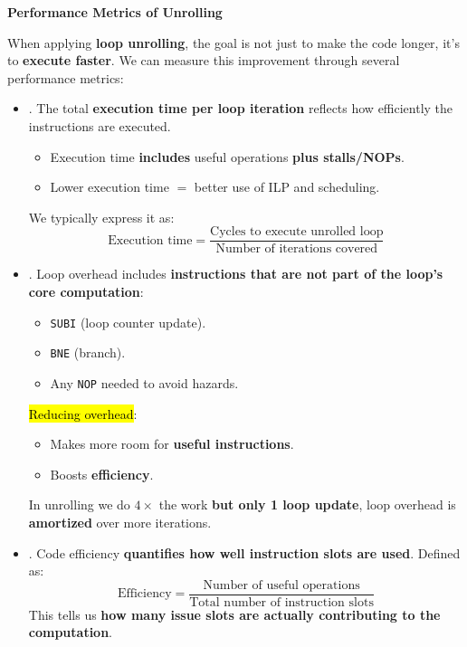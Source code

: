 \begin{flushleft}
    \textcolor{Green3}{\faIcon{\speedIcon} \textbf{Performance Metrics of Unrolling}}
\end{flushleft}
When applying \textbf{loop unrolling}, the goal is not just to make the code longer, it's to \textbf{execute faster}. We can measure this improvement through several performance metrics:
\begin{itemize}
    \item {}. The total \textbf{execution time per loop iteration} reflects how efficiently the instructions are executed.
    \begin{itemize}
        \item Execution time \textbf{includes} useful operations \textbf{plus stalls/NOPs}.
        \item Lower execution time $=$ better use of ILP and scheduling.
    \end{itemize}
    We typically express it as:
    \begin{equation}
        \text{Execution time} = \dfrac{\text{Cycles to execute unrolled loop}}{\text{Number of iterations covered}}
    \end{equation}


    \item {}. Loop overhead includes \textbf{instructions that are not part of the loop's core computation}:
    \begin{itemize}
        \item \texttt{SUBI} (loop counter update).
        \item \texttt{BNE} (branch).
        \item Any \texttt{NOP} needed to avoid hazards.
    \end{itemize}
    \hl{Reducing overhead}:
    \begin{itemize}
        \item Makes more room for \textbf{useful instructions}.
        \item Boosts \textbf{efficiency}.
    \end{itemize}
    In unrolling we do $4\times$ the work \textbf{but only 1 loop update}, loop overhead is \textbf{amortized} over more iterations.


    \item {}. Code efficiency \textbf{quantifies how well instruction slots are used}. Defined as:
    \begin{equation}
        \text{Efficiency} = \dfrac{\text{Number of useful operations}}{\text{Total number of instruction slots}}
    \end{equation}
    This tells us \textbf{how many issue slots are actually contributing to the computation}.
\end{itemize}